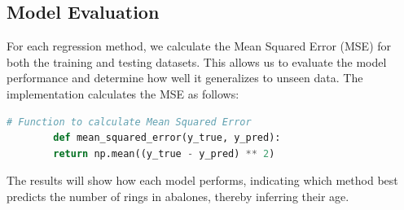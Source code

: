 \documentclass{article}
\begin{document}
	\subsection*{Model Evaluation}
	For each regression method, we calculate the Mean Squared Error (MSE) for both the training and testing datasets. This allows us to evaluate the model performance and determine how well it generalizes to unseen data. The implementation calculates the MSE as follows:
	\begin{lstlisting}[language=Python]
		# Function to calculate Mean Squared Error
		def mean_squared_error(y_true, y_pred):
		return np.mean((y_true - y_pred) ** 2)
	\end{lstlisting}
	
	The results will show how each model performs, indicating which method best predicts the number of rings in abalones, thereby inferring their age.
	
	
	
\end{document}
